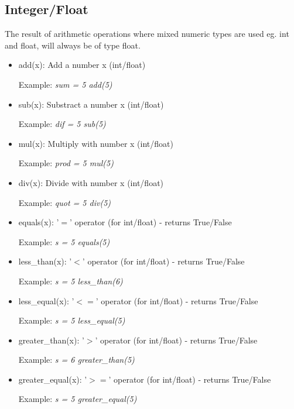 \documentclass{article}
\begin{document}
\subsection{Integer/Float}
\label{intfloat}
	The result of arithmetic operations where mixed numeric types are used eg. int and float, will always be of type float.

\begin{itemize}
\item add(x): Add a number x (int/float)

Example: \textit{sum = 5 add(5)}

\item sub(x): Substract a number x (int/float)

Example: \textit{dif = 5 sub(5)}

\item mul(x): Multiply with number x (int/float)

Example: \textit{prod = 5 mul(5)}

\item div(x): Divide with number x (int/float)

Example: \textit{quot = 5 div(5)}

\item equals(x): '$=$' operator (for int/float) - returns True/False

Example: \textit{s = 5 equals(5)}

\item less\_than(x): '$<$' operator (for int/float) - returns True/False

Example: \textit{s = 5 less\_than(6)}

\item less\_equal(x): '$<=$' operator (for int/float) - returns True/False

Example: \textit{s = 5 less\_equal(5)}

\item greater\_than(x): '$>$' operator (for int/float) - returns True/False

Example: \textit{s = 6 greater\_than(5)}

\item greater\_equal(x): '$>=$' operator (for int/float) - returns True/False

Example: \textit{s = 5 greater\_equal(5)}
\end{itemize}
\end{document}
